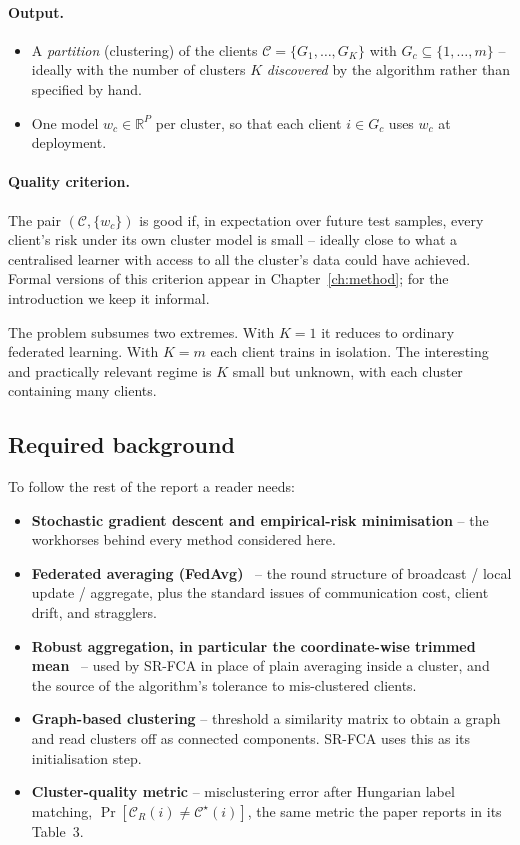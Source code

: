 \paragraph{Output.}
\begin{itemize}
    \item A \emph{partition} (clustering) of the clients $\mathcal{C} = \{G_1, \dots, G_K\}$ with $G_c \subseteq \{1,\dots,m\}$ -- ideally with the number of clusters $K$ \emph{discovered} by the algorithm rather than specified by hand.
    \item One model $w_c \in \mathbb{R}^P$ per cluster, so that each client $i \in G_c$ uses $w_c$ at deployment.
\end{itemize}

\paragraph{Quality criterion.} The pair $(\mathcal{C}, \{w_c\})$ is good if, in expectation over future test samples, every client's risk under its own cluster model is small -- ideally close to what a centralised learner with access to all the cluster's data could have achieved. Formal versions of this criterion appear in Chapter~\ref{ch:method}; for the introduction we keep it informal.

The problem subsumes two extremes. With $K = 1$ it reduces to ordinary federated learning. With $K = m$ each client trains in isolation. The interesting and practically relevant regime is $K$ small but unknown, with each cluster containing many clients.

\subsection*{Required background}

To follow the rest of the report a reader needs:

\begin{itemize}
    \item \textbf{Stochastic gradient descent and empirical-risk minimisation} -- the workhorses behind every method considered here.
    \item \textbf{Federated averaging (FedAvg)}~\parencite{mcmahan2017fedavg} -- the round structure of broadcast / local update / aggregate, plus the standard issues of communication cost, client drift, and stragglers.
    \item \textbf{Robust aggregation, in particular the coordinate-wise trimmed mean}~\parencite{yin2018trimmedmean} -- used by SR-FCA in place of plain averaging inside a cluster, and the source of the algorithm's tolerance to mis-clustered clients.
    \item \textbf{Graph-based clustering} -- threshold a similarity matrix to obtain a graph and read clusters off as connected components. SR-FCA uses this as its initialisation step.
    \item \textbf{Cluster-quality metric} -- misclustering error after Hungarian label matching, $\Pr[\mathcal{C}_R(i) \ne \mathcal{C}^\star(i)]$, the same metric the paper reports in its Table~3.
\end{itemize}

